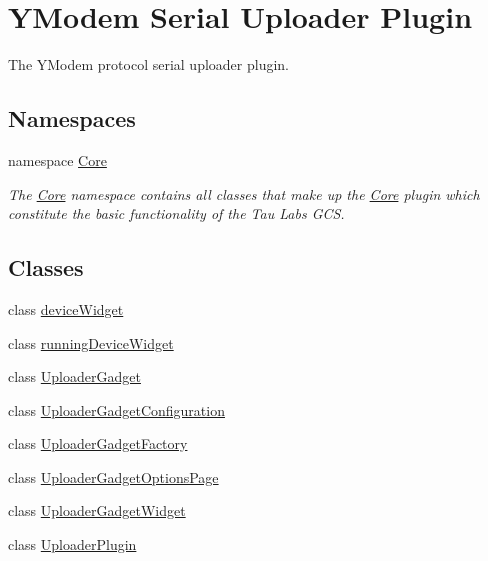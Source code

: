 \hypertarget{group___y_modem_uploader}{\section{Y\-Modem Serial Uploader Plugin}
\label{group___y_modem_uploader}
}


The Y\-Modem protocol serial uploader plugin.  


\subsection*{Namespaces}
\begin{DoxyCompactItemize}
\item 
namespace \hyperlink{namespace_core}{Core}
\begin{DoxyCompactList}\small\item\em The \hyperlink{namespace_core}{Core} namespace contains all classes that make up the \hyperlink{namespace_core}{Core} plugin which constitute the basic functionality of the Tau Labs G\-C\-S. \end{DoxyCompactList}\end{DoxyCompactItemize}
\subsection*{Classes}
\begin{DoxyCompactItemize}
\item 
class \hyperlink{classdevice_widget}{device\-Widget}
\item 
class \hyperlink{classrunning_device_widget}{running\-Device\-Widget}
\item 
class \hyperlink{class_uploader_gadget}{Uploader\-Gadget}
\item 
class \hyperlink{class_uploader_gadget_configuration}{Uploader\-Gadget\-Configuration}
\item 
class \hyperlink{class_uploader_gadget_factory}{Uploader\-Gadget\-Factory}
\item 
class \hyperlink{class_uploader_gadget_options_page}{Uploader\-Gadget\-Options\-Page}
\item 
class \hyperlink{class_uploader_gadget_widget}{Uploader\-Gadget\-Widget}
\item 
class \hyperlink{class_uploader_plugin}{Uploader\-Plugin}
\end{DoxyCompactItemize}

